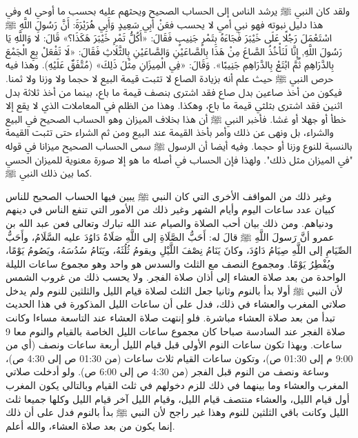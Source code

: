 ولقد كان النبي ﷺ يرشد الناس إلى الحساب الصحيح ويحثهم عليه بحسب ما أوحي له وفي هذا دليل نبوته فهو نبي أمي لا يحسب فعَنْ أَبِي سَعِيدٍ وَأَبِي هُرَيْرَةَ: أَنَّ رَسُولَ اللَّهِ ﷺ اسْتَعْمَلَ رَجُلًا عَلَى خَيْبَرَ فَجَاءَهُ بِتَمْرٍ جَنِيبٍ فَقَالَ: «أَكُلُّ تَمْرِ خَيْبَرَ هَكَذَا؟» قَالَ: لَا وَاللَّهِ يَا رَسُولَ اللَّهِ, إِنَّا لَنَأْخُذُ الصَّاعَ مِنْ هَذَا بِالصَّاعَيْنِ وَالصَّاعَيْنِ بِالثَّلَاثِ فَقَالَ: «لَا تَفْعَلْ بِعِ الْجَمْعَ بِالدَّرَاهِمِ ثُمَّ ابْتَعْ بِالدَّرَاهِمِ جَنِيبًا». وَقَالَ: «فِي الْمِيزَانِ مِثْلَ ذَلِكَ» {\footnotesize (مُتَّفَقٌ عَلَيْهِ)}.
وهذا فيه حرص النبي ﷺ حيث علم أنه بزيادة الصاع لا تثبت قيمة البيع لا حجما ولا وزنا ولا ثمنا. فيكون من أخذ صاعين بدل صاع فقد اشترى بنصف قيمة ما باع، بينما من أخذ ثلاثة بدل اثنين فقد اشترى بثلثي قيمة ما باع، وهكذا. وهذا من الظلم في المعاملات الذي لا يقع إلا خطأ أو جهلا أو غشا. فأخبر النبي ﷺ أن هذا بخلاف الميزان وهو الحساب الصحيح في البيع والشراء، بل ونهى عن ذلك وأمر بأخذ القيمة عند البيع ومن ثم الشراء حتى تثبت القيمة بالنسبة للنوع وزنا أو حجما. وفيه أيضا أن الرسول ﷺ سمى الحساب الصحيح ميزانا في قوله "في الميزان مثل ذلك". ولهذا فإن الحساب في أصله ما هو إلا صورة معنوية للميزان الحسي كما بين ذلك النبي ﷺ.

وغير ذلك من المواقف الأخرى التي كان النبي ﷺ يبين فيها الحساب الصحيح للناس كبيان عدد ساعات اليوم وأيام الشهر وغير ذلك من الأمور التي تنفع الناس في دينهم ودنياهم. ومن ذلك بيان أحب الصلاة والصيام عند الله تبارك وتعالى فعن عبد الله بن عمرو أنَّ رَسولَ اللَّهِ ﷺ قالَ له: أَحَبُّ الصَّلَاةِ إلى اللَّهِ صَلَاةُ دَاوُدَ عليه السَّلَامُ، وأَحَبُّ الصِّيَامِ إلى اللَّهِ صِيَامُ دَاوُدَ، وكانَ يَنَامُ نِصْفَ اللَّيْلِ ويقومُ ثُلُثَهُ، ويَنَامُ سُدُسَهُ، ويَصُومُ يَوْمًا، ويُفْطِرُ يَوْمًا. ومجموع النصف مع الثلث والسدس هو واحد وهو مجموع ساعات الليلة الواحدة من بعد صلاة العشاء إلى أذان صلاة الفجر. ولا يحسب ذلك من غروب الشمس لأن النبي ﷺ أولا بدأ بالنوم وثانيا جعل الثلث لصلاة قيام الليل والثلثين للنوم ولم يدخل صلاتي المغرب والعشاء في ذلك، فدل على أن ساعات الليل المذكورة في هذا الحديث تبدأ من بعد صلاة العشاء مباشرة. فلو إنتهت صلاة العشاء عند التاسعة مساءا وكانت صلاة الفجر عند السادسة صباحا كان مجموع ساعات الليل الخاصة بالقيام والنوم معا 9 ساعات. وبهذا تكون ساعات النوم الأولى قبل قيام الليل أربعة ساعات ونصف (أي من 9:00 م إلى 01:30 ص)، وتكون ساعات القيام ثلاث ساعات (من 01:30 ص إلى 4:30 ص)، وساعة ونصف من النوم قبل الفجر (من 4:30 ص إلى 6:00 ص). ولو أدخلت صلاتي المغرب والعشاء وما بينهما في ذلك للزم دخولهم في ثلث القيام وبالتالي يكون المغرب أول قيام الليل، والعشاء منتصف قيام الليل، وقيام الليل آخر قيام الليل وكلها جميعا ثلث الليل وكانت باقي الثلثين للنوم وهذا غير راجح لأن النبي ﷺ بدأ بالنوم فدل على أن ذلك إنما يكون من بعد صلاة العشاء، والله أعلم.

